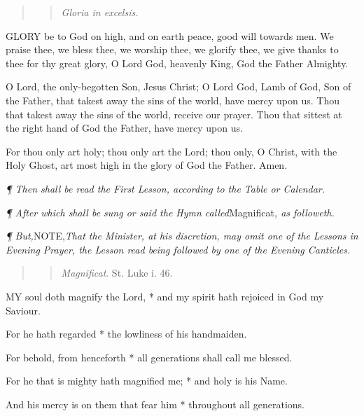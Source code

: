 \begin{quote}

\begin{quote}

\emph{Gloria
in excelsis.}

\end{quote}

\end{quote}

GLORY
be to God on high, and on earth peace, good will towards men. We praise
thee, we bless thee, we worship thee, we glorify thee, we give thanks
to thee for thy great glory, O Lord God, heavenly King, God the Father
Almighty.

O Lord, the only-begotten Son, Jesus Christ; O Lord
God, Lamb of God, Son of the Father, that takest away the sins of the
world, have mercy upon us. Thou that takest away the sins of the world,
receive our prayer. Thou that sittest at the right hand of God the Father,
have mercy upon us.

For thou only art holy; thou only art the Lord; thou
only, O Christ, with the Holy Ghost, art most high in the glory of God
the Father. Amen.

\emph{¶
Then shall be read the First Lesson, according to the Table or Calendar.}

\emph{¶
After which shall be sung or said the Hymn called}Magnificat\emph{,
as followeth.}

\emph{¶
But,}NOTE,\emph{That the Minister, at his discretion, may omit one of the Lessons in
Evening Prayer, the Lesson read being followed by one of the Evening
Canticles.}\emph{}

\begin{quote}

\begin{quote}

\emph{Magnificat}.
St. Luke i. 46.

\end{quote}

\end{quote}

MY
soul doth magnify the Lord, * and my spirit hath rejoiced in God my Saviour.

For he hath regarded * the lowliness of his handmaiden.

For behold, from henceforth * all generations shall
call me blessed.

For he that is mighty hath magnified me; * and holy
is his Name.

And his mercy is on them that fear him * throughout
all generations.

